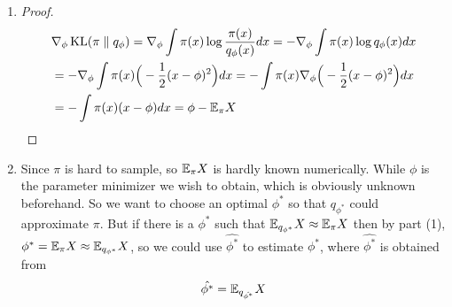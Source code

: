 \documentclass{article}
\DeclareMathOperator{\KL}{\text{KL}}
\begin{document}



\begin{enumerate}
\item 
\begin{proof}
\begin{align*}
& \nabla_{\phi}\KL(\pi \parallel q_{\phi}) = \nabla_{\phi} \int\pi(x) \log \frac{\pi(x)}{q_{\phi}(x)} dx = -\nabla_{\phi} \int \pi(x) \log q_{\phi}(x) dx\\
& = -\nabla_{\phi} \int \pi(x) \Big(-\frac12 (x-\phi)^2\Big) dx = -\int \pi(x) \nabla_{\phi}\Big(-\frac12 (x-\phi)^2\Big) dx\\
& = -\int \pi(x) (x - \phi) dx = \phi - \E_{\pi} X
\end{align*}

\end{proof}
\item 
Since $\pi$ is hard to sample, so $\mathbb{E}_{\pi} X$ is hardly known numerically. While $\phi$ is the parameter minimizer we wish to obtain, which is obviously unknown beforehand. So we want to choose an optimal $\phi^*$ so that $q_{\phi^*}$ could approximate $\pi$. But if there is a $\phi^*$ such that $\mathbb{E}_{q_{\phi^*}} X \approx \mathbb{E}_{\pi} X$ then by part (1), $\phi^* = \mathbb{E}_{\pi} X \approx \mathbb{E}_{q_{\phi^*}} X$, so we could use $\hat{\phi^*}$ to estimate $\phi^*$, where $\hat{\phi^*}$ is obtained from \[\hat{\phi^*} = \mathbb{E}_{q_{\hat{\phi^*}}} X\]
\end{enumerate}
    
\end{document}
